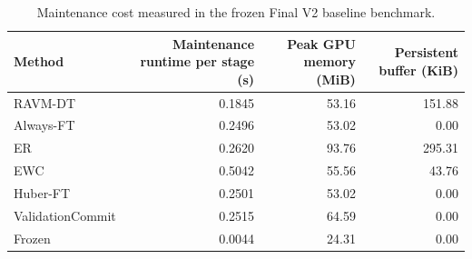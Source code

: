\begin{table}[t]
\centering
\small
\caption{Maintenance cost measured in the frozen Final V2 baseline benchmark.}
\label{tab:maintenance_cost}
\begin{tabular}{lrrr}
\toprule
Method & Maintenance runtime per stage (s) & Peak GPU memory (MiB) & Persistent buffer (KiB) \\
\midrule
RAVM-DT & 0.1845 & 53.16 & 151.88 \\
Always-FT & 0.2496 & 53.02 & 0.00 \\
ER & 0.2620 & 93.76 & 295.31 \\
EWC & 0.5042 & 55.56 & 43.76 \\
Huber-FT & 0.2501 & 53.02 & 0.00 \\
ValidationCommit & 0.2515 & 64.59 & 0.00 \\
Frozen & 0.0044 & 24.31 & 0.00 \\
\bottomrule
\end{tabular}
\end{table}
